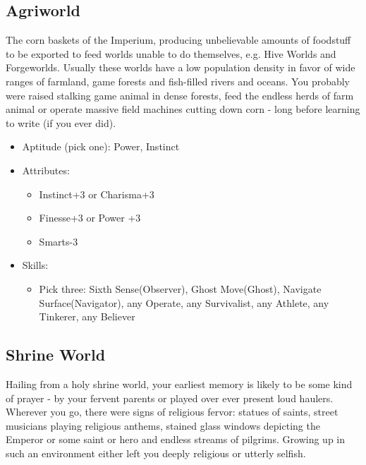 \subsection{Agriworld}
The corn baskets of the Imperium, producing unbelievable amounts of foodstuff to be exported to feed worlds unable to do themselves, e.g. Hive Worlds and Forgeworlds. Usually these worlds have a low population density in favor of wide ranges of farmland, game forests and fish-filled rivers and oceans. You probably were raised stalking game animal in dense forests, feed the endless herds of farm animal or operate massive field machines cutting down corn - long before learning to write (if you ever did).

\begin{itemize}
	\item Aptitude (pick one): Power, Instinct
	\item Attributes:
	\begin{itemize}
		\item Instinct+3 or Charisma+3
		\item Finesse+3 or Power +3
		\item Smarts-3
	\end{itemize}
	\item Skills: 
	\begin{itemize}
	 	\item Pick three: Sixth Sense(Observer), Ghost Move(Ghost), Navigate Surface(Navigator), any Operate, any Survivalist, any Athlete, any Tinkerer, any Believer
	 \end{itemize} 
\end{itemize}

\subsection{Shrine World}
Hailing from a holy shrine world, your earliest memory is likely to be some kind of prayer - by your fervent parents or played over ever present loud haulers. Wherever you go, there were signs of religious fervor: statues of saints, street musicians playing religious anthems, stained glass windows depicting the Emperor or some saint or hero and endless streams of pilgrims. Growing up in such an environment either left you deeply religious or utterly selfish.

